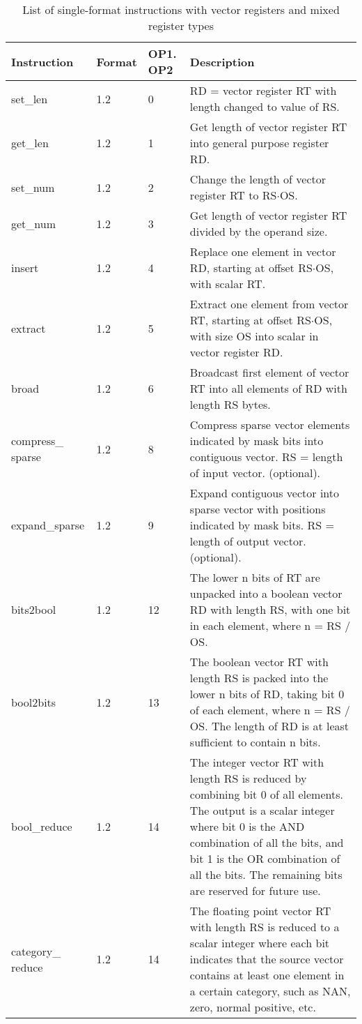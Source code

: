 \documentclass[forwardcom.tex]{subfiles}
\begin{document}
\begin{longtable} {|p{25mm}|p{12mm}|p{12mm}|p{95mm}|}
\caption{List of single-format instructions with vector registers and mixed register types} 
\label{table:ListOfSingleFormatInstructionsVector} \\
\endfirsthead
\endhead
\hline
\bfseries Instruction & \bfseries Format &\bfseries OP1. OP2 & \bfseries Description \\
\hline
set\_len      & 1.2 &  0 & RD = vector register RT with length changed to value of RS. \\
get\_len      & 1.2 &  1 & Get length of vector register RT into general purpose register RD. \\
set\_num      & 1.2 &  2 & Change the length of vector register RT to RS$\cdot$OS. \\
get\_num      & 1.2 &  3 & Get length of vector register RT divided by the operand size. \\

insert        & 1.2 &  4 & Replace one element in vector RD, starting at offset RS$\cdot$OS, with scalar RT. \\

extract       & 1.2 & 5 & Extract one element from vector RT, starting at offset RS$\cdot$OS, with size OS into scalar in vector register RD. \\

broad         & 1.2 & 6 & Broadcast first element of vector RT into all elements of RD with length RS bytes. \\

compress\_ sparse&1.2 &  8 & Compress sparse vector elements indicated by mask bits into contiguous vector. RS = length of input vector. (optional). \\
expand\_sparse& 1.2 & 9 & Expand contiguous vector into sparse vector with positions indicated by mask bits. RS = length of output vector. (optional). \\

bits2bool     & 1.2 & 12 & The lower n bits of RT are unpacked into a boolean vector RD with length RS, with one bit in each element, where n = RS / OS. \\
bool2bits     & 1.2 & 13 & The boolean vector RT with length RS is packed into the lower n bits of RD, taking bit 0 of each element, where n = RS / OS. The
length of RD is at least sufficient to contain n bits. \\
bool\_reduce  & 1.2 & 14 & The integer vector RT with length RS is reduced by combining bit 0 of all elements. The output is a scalar integer where bit 0 is the
AND combination of all the bits, and bit 1 is the OR combination of
all the bits. The remaining bits are reserved for future use. \\
category\_ reduce & 1.2 & 14 & The floating point vector RT with length RS is reduced to a scalar integer where each bit indicates that the source vector contains at least one element in a certain category, such as NAN, zero, normal positive, etc. \\


\end{longtable}
\end{document}
